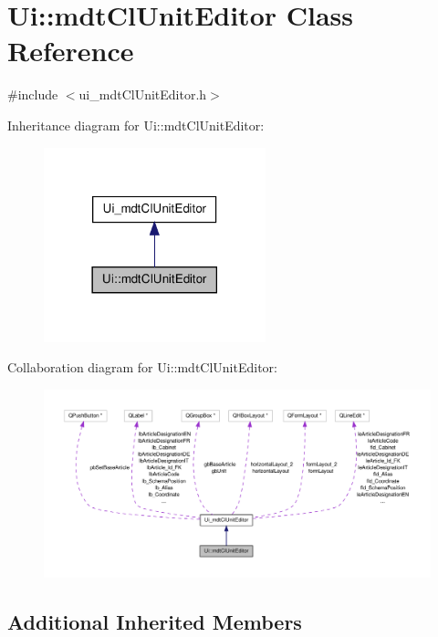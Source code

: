 \hypertarget{class_ui_1_1mdt_cl_unit_editor}{\section{Ui\-:\-:mdt\-Cl\-Unit\-Editor Class Reference}
\label{class_ui_1_1mdt_cl_unit_editor}
}


{\ttfamily \#include $<$ui\-\_\-mdt\-Cl\-Unit\-Editor.\-h$>$}



Inheritance diagram for Ui\-:\-:mdt\-Cl\-Unit\-Editor\-:
\nopagebreak
\begin{figure}[H]
\begin{center}
\leavevmode
\includegraphics[width=182pt]{class_ui_1_1mdt_cl_unit_editor__inherit__graph}
\end{center}
\end{figure}


Collaboration diagram for Ui\-:\-:mdt\-Cl\-Unit\-Editor\-:
\nopagebreak
\begin{figure}[H]
\begin{center}
\leavevmode
\includegraphics[width=350pt]{class_ui_1_1mdt_cl_unit_editor__coll__graph}
\end{center}
\end{figure}
\subsection*{Additional Inherited Members}


